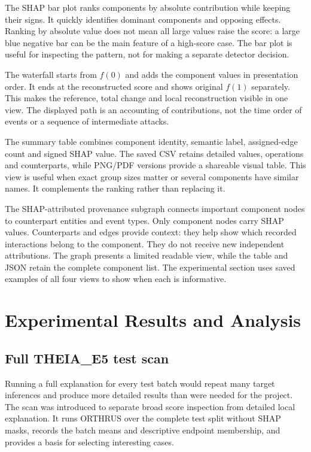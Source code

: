\documentclass[11pt,a4paper]{article}
\begin{document}
The SHAP bar plot ranks components by absolute contribution while keeping their
signs. It quickly identifies dominant components and opposing effects. Ranking
by absolute value does not mean all large values raise the score: a large blue
negative bar can be the main feature of a high-score case. The bar plot is
useful for inspecting the pattern, not for making a separate detector decision.

The waterfall starts from $f(0)$ and adds the component values in presentation
order. It ends at the reconstructed score and shows original $f(1)$ separately.
This makes the reference, total change and local reconstruction visible in one
view. The displayed path is an accounting of contributions, not the time order
of events or a sequence of intermediate attacks.

The summary table combines component identity, semantic label, assigned-edge
count and signed SHAP value. The saved CSV retains detailed values, operations
and counterparts, while PNG/PDF versions provide a shareable visual table.
This view is useful when exact group sizes matter or several components have
similar names. It complements the ranking rather than replacing it.

The SHAP-attributed provenance subgraph connects important component nodes to
counterpart entities and event types. Only component nodes carry SHAP values.
Counterparts and edges provide context: they help show which recorded
interactions belong to the component. They do not receive new independent
attributions. The graph presents a limited readable view, while the table and
JSON retain the complete component list. The experimental section uses saved
examples of all four views to show when each is informative.

\section{Experimental Results and Analysis}
\subsection{Full THEIA\_E5 test scan}
Running a full explanation for every test batch would repeat many target
inferences and produce more detailed results than were needed for the project.
The scan was introduced to separate broad score inspection from detailed local
explanation. It runs ORTHRUS over the complete test split without SHAP masks,
records the batch means and descriptive endpoint membership, and provides a
basis for selecting interesting cases.
\end{document}
